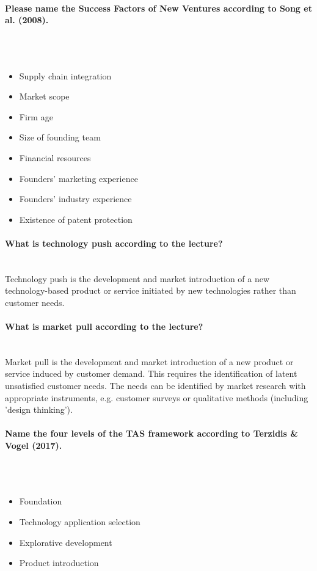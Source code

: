 \documentclass[10pt,a4paper,noendnumber=true]{scrartcl}
\newcommand{\properparagraph}[1]{\paragraph{\textcolor{Emerald}{#1}}\mbox{}\\}
\begin{document}
\properparagraph{Please name the Success Factors of New Ventures according to Song et al. (2008).}
\\[-6ex]
\begin{itemize}
	\item Supply chain integration
	\item Market scope
	\item Firm age
	\item Size of founding team
	\item Financial resources
	\item Founders' marketing experience
	\item Founders' industry experience
	\item Existence of patent protection
\end{itemize}

\properparagraph{What is technology push according to the lecture?}
Technology push is the development and market introduction of a new technology-based product or service initiated by new technologies rather than customer needs.

\properparagraph{What is market pull according to the lecture?}
Market pull is the development and market introduction of a new product or service induced by customer demand. This requires the identification of latent unsatisfied customer needs. The needs can be identified by market research with appropriate instruments, e.g. customer surveys or qualitative methods (including 'design thinking').

\properparagraph{Name the four levels of the TAS framework according to Terzidis \& Vogel (2017).}
\\[-6ex]
\begin{itemize}
	\item Foundation
	\item Technology application selection
	\item Explorative development
	\item Product introduction
\end{itemize}
\end{document}
